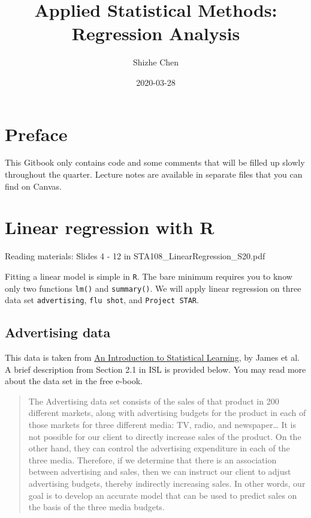 \documentclass[12pt,]{book}
\title{Applied Statistical Methods: Regression Analysis}
\author{Shizhe Chen}
\date{2020-03-28}
\begin{document}
\maketitle

{
\setcounter{tocdepth}{1}
\tableofcontents
}
\chapter*{Preface}\label{pre}

This Gitbook only contains code and some comments that will be filled up
slowly throughout the quarter. Lecture notes are available in separate
files that you can find on Canvas.

\chapter{Linear regression with R}\label{ch:lmR}

Reading materials: Slides 4 - 12 in STA108\_LinearRegression\_S20.pdf

Fitting a linear model is simple in \texttt{R}. The bare minimum
requires you to know only two functions \texttt{lm()} and
\texttt{summary()}. We will apply linear regression on three data set
\texttt{advertising}, \texttt{flu\ shot}, and \texttt{Project\ STAR}.

\section{Advertising data}\label{advertising-data}

This data is taken from
\href{http://faculty.marshall.usc.edu/gareth-james/ISL/}{An Introduction
to Statistical Learning}, by James et al. A brief description from
Section 2.1 in ISL is provided below. You may read more about the data
set in the free e-book.

\begin{quote}
The Advertising data set consists of the sales of that product in 200
different markets, along with advertising budgets for the product in
each of those markets for three different media: TV, radio, and
newspaper\ldots{} It is not possible for our client to directly increase
sales of the product. On the other hand, they can control the
advertising expenditure in each of the three media. Therefore, if we
determine that there is an association between advertising and sales,
then we can instruct our client to adjust advertising budgets, thereby
indirectly increasing sales. In other words, our goal is to develop an
accurate model that can be used to predict sales on the basis of the
three media budgets.
\end{quote}
\end{document}
